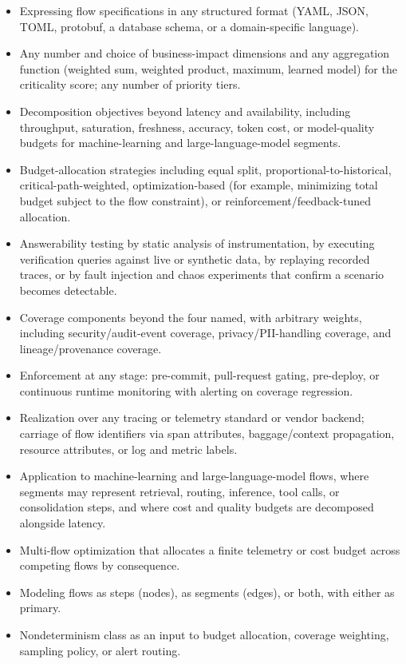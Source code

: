 \documentclass[11pt]{article}
\begin{document}
\begin{itemize}
\item Expressing flow specifications in any structured format (YAML, JSON, TOML, protobuf, a database schema, or a domain-specific language).
\item Any number and choice of business-impact dimensions and any aggregation function (weighted sum, weighted product, maximum, learned model) for the criticality score; any number of priority tiers.
\item Decomposition objectives beyond latency and availability, including throughput, saturation, freshness, accuracy, token cost, or model-quality budgets for machine-learning and large-language-model segments.
\item Budget-allocation strategies including equal split, proportional-to-historical, critical-path-weighted, optimization-based (for example, minimizing total budget subject to the flow constraint), or reinforcement/feedback-tuned allocation.
\item Answerability testing by static analysis of instrumentation, by executing verification queries against live or synthetic data, by replaying recorded traces, or by fault injection and chaos experiments that confirm a scenario becomes detectable.
\item Coverage components beyond the four named, with arbitrary weights, including security/audit-event coverage, privacy/PII-handling coverage, and lineage/provenance coverage.
\item Enforcement at any stage: pre-commit, pull-request gating, pre-deploy, or continuous runtime monitoring with alerting on coverage regression.
\item Realization over any tracing or telemetry standard or vendor backend; carriage of flow identifiers via span attributes, baggage/context propagation, resource attributes, or log and metric labels.
\item Application to machine-learning and large-language-model flows, where segments may represent retrieval, routing, inference, tool calls, or consolidation steps, and where cost and quality budgets are decomposed alongside latency.
\item Multi-flow optimization that allocates a finite telemetry or cost budget across competing flows by consequence.
\item Modeling flows as steps (nodes), as segments (edges), or both, with either as primary.
\item Nondeterminism class as an input to budget allocation, coverage weighting, sampling policy, or alert routing.

\end{itemize}
\end{document}

